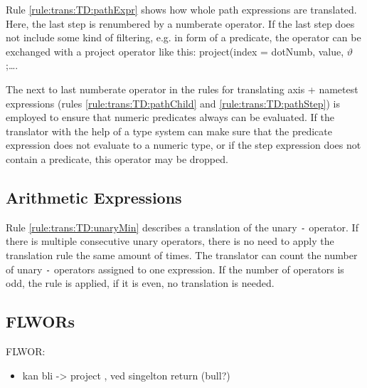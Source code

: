 Rule \ref{rule:trans:TD:pathExpr} shows how whole path expressions are translated. Here, the last step is
renumbered by a \textsf{numberate} operator. If the last step does not include some kind of filtering, e.g. in
form of a predicate, the operator can be exchanged with a \textsf{project} operator like this:
\textsf{project(index = dotNumb, value, }$\vartheta$\textsf{;\ldots}.

The next to last \textsf{numberate} operator in the rules for translating axis + nametest expressions (rules
\ref{rule:trans:TD:pathChild} and \ref{rule:trans:TD:pathStep}) is employed to ensure that numeric predicates
always can be evaluated. If the translator with the help of a type system can make sure that the predicate
expression does not evaluate to a numeric type, or if the step expression does not contain a predicate, this
operator may be dropped.

\subsection{Arithmetic Expressions}
\label{sect:trans:TD:simpl:arith}

Rule \ref{rule:trans:TD:unaryMin} describes a translation of the unary \texttt{-} operator. If there is multiple
consecutive unary operators, there is no need to apply the translation rule the same amount of times. The
translator can count the number of unary \texttt{-} operators assigned to one expression. If the number of
operators is odd, the rule is applied, if it is even, no translation is needed.


\subsection{FLWORs}
\label{sect:trans:TD:simpl:flwor}        
  FLWOR:
  	\begin{itemize}
        \item  kan bli -> project , ved singelton return (bull?)
      \end{itemize}

